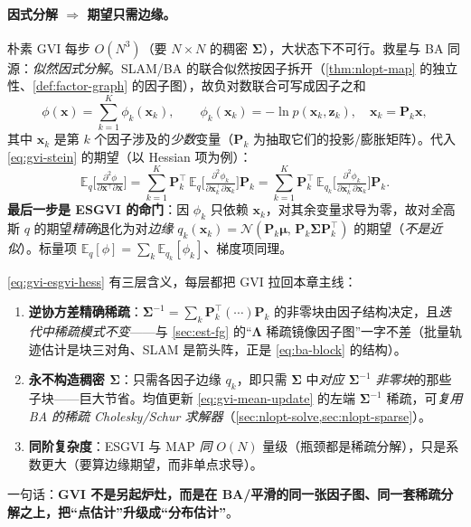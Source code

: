 \paragraph{因式分解 $\Rightarrow$ 期望只需边缘。}
朴素 GVI 每步 $O(N^3)$（要 $N\times N$ 的稠密 $\boldsymbol{\Sigma}$），大状态下不可行。救星与 BA 同源：\emph{似然因式分解}。SLAM/BA 的联合似然按因子拆开（\cref{thm:nlopt-map} 的独立性、\cref{def:factor-graph} 的因子图），故负对数联合可写成因子之和
\begin{equation}
  \phi(\mathbf{x})=\sum_{k=1}^{K}\phi_k(\mathbf{x}_k),\qquad \phi_k(\mathbf{x}_k)=-\ln p(\mathbf{x}_k,\mathbf{z}_k),\quad \mathbf{x}_k=\mathbf{P}_k\mathbf{x},
  \label{eq:gvi-factored}
\end{equation}
其中 $\mathbf{x}_k$ 是第 $k$ 个因子涉及的\emph{少数}变量（$\mathbf{P}_k$ 为抽取它们的投影/膨胀矩阵）。代入 \cref{eq:gvi-stein} 的期望（以 Hessian 项为例）：
\begin{equation}
  \mathbb{E}_q\!\Big[\tfrac{\partial^2\phi}{\partial\mathbf{x}^\top\partial\mathbf{x}}\Big]
  =\sum_{k=1}^{K}\mathbf{P}_k^\top\,\mathbb{E}_{q}\!\Big[\tfrac{\partial^2\phi_k}{\partial\mathbf{x}_k^\top\partial\mathbf{x}_k}\Big]\mathbf{P}_k
  =\sum_{k=1}^{K}\mathbf{P}_k^\top\,\mathbb{E}_{q_k}\!\Big[\tfrac{\partial^2\phi_k}{\partial\mathbf{x}_k^\top\partial\mathbf{x}_k}\Big]\mathbf{P}_k.
  \label{eq:gvi-esgvi-hess}
\end{equation}
\textbf{最后一步是 ESGVI 的命门}：因 $\phi_k$ 只依赖 $\mathbf{x}_k$，对其余变量求导为零，故对\emph{全}高斯 $q$ 的期望\emph{精确}退化为对\emph{边缘} $q_k(\mathbf{x}_k)=\mathcal{N}(\mathbf{P}_k\boldsymbol{\mu},\,\mathbf{P}_k\boldsymbol{\Sigma}\mathbf{P}_k^\top)$ 的期望（\emph{不是近似}）。标量项 $\mathbb{E}_q[\phi]=\sum_k\mathbb{E}_{q_k}[\phi_k]$、梯度项同理。

\begin{insight}[ESGVI $=$ GVI 接回 BA 稀疏后端]
\cref{eq:gvi-esgvi-hess} 有三层含义，每层都把 GVI 拉回本章主线：
\begin{enumerate}
  \item \textbf{逆协方差精确稀疏}：$\boldsymbol{\Sigma}^{-1}=\sum_k\mathbf{P}_k^\top(\cdots)\mathbf{P}_k$ 的非零块由因子结构决定，且\emph{迭代中稀疏模式不变}——与 \cref{sec:est-fg} 的“$\boldsymbol{\Lambda}$ 稀疏镜像因子图”一字不差（批量轨迹估计是块三对角、SLAM 是箭头阵，正是 \cref{eq:ba-block} 的结构）。
  \item \textbf{永不构造稠密 $\boldsymbol{\Sigma}$}：只需各因子边缘 $q_k$，即只需 $\boldsymbol{\Sigma}$ 中\emph{对应 $\boldsymbol{\Sigma}^{-1}$ 非零块}的那些子块——巨大节省。均值更新 \cref{eq:gvi-mean-update} 的左端 $\boldsymbol{\Sigma}^{-1}$ 稀疏，可\emph{复用 BA 的稀疏 Cholesky/Schur 求解器}（\cref{sec:nlopt-solve,sec:nlopt-sparse}）。
  \item \textbf{同阶复杂度}：ESGVI 与 MAP \emph{同} $O(N)$ 量级（瓶颈都是稀疏分解），只是系数更大（要算边缘期望，而非单点求导）。
\end{enumerate}
一句话：\textbf{GVI 不是另起炉灶，而是在 BA/平滑的同一张因子图、同一套稀疏分解之上，把“点估计”升级成“分布估计”}。
\end{insight}

